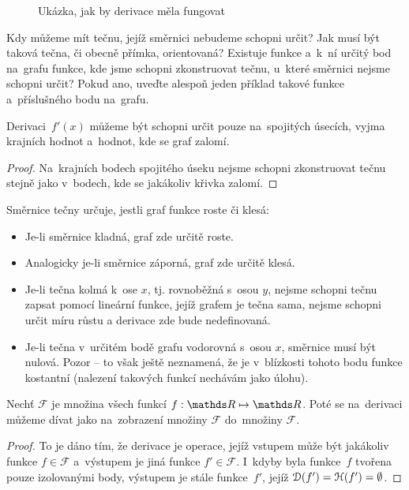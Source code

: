 \begin{figure}[ht!]
    \centering
    
    \caption{Ukázka, jak by derivace měla fungovat}
    \label{fig:derivace-tecny}
\end{figure}

\begin{exercise}
    Kdy můžeme mít tečnu, jejíž směrnici nebudeme schopni určit? Jak musí být taková
    tečna, či obecně přímka, orientovaná? Existuje funkce a~k~ní určitý bod na~grafu
    funkce, kde jsme schopni zkonstruovat tečnu, u~které směrnici nejsme schopni
    určit? Pokud ano, uveďte alespoň jeden příklad takové funkce a~příslušného bodu
    na~grafu.
\end{exercise}

\begin{lemma}
    Derivaci~$f'(x)$ můžeme být schopni určit pouze na~spojitých úsecích, vyjma
    krajních hodnot a~hodnot, kde se graf zalomí.

    \begin{proof}
        Na~krajních bodech spojitého úseku nejsme schopni zkonstruovat tečnu stejně
        jako v~bodech, kde se jakákoliv křivka zalomí.
    \end{proof}
\end{lemma}

\begin{lemma}
    Směrnice tečny určuje, jestli graf funkce roste či klesá:
    \begin{itemize}
        \item Je-li směrnice kladná, graf zde určitě roste.
        \item Analogicky je-li směrnice záporná, graf zde určitě klesá.
        \item Je-li tečna kolmá k~ose $x$, tj. rovnoběžná s~osou $y$, nejsme
        schopni tečnu zapsat pomocí lineární funkce, jejíž grafem je tečna
        sama, nejsme schopni určit míru růstu a derivace zde bude nedefinovaná.
        \item Je-li tečna v~určitém bodě grafu vodorovná s~osou $x$, směrnice
        musí být nulová. Pozor -- to však ještě neznamená, že je v~blízkosti
        tohoto bodu funkce kostantní (nalezení takových funkcí nechávám jako
        úlohu).
    \end{itemize}
\end{lemma}

\begin{lemma}
    Nechť $\mathcal{F}$ je množina všech funkcí ${f: \reals \mapsto \reals}$. Poté se
    na~derivaci můžeme dívat jako na~zobrazení množiny $\mathcal{F}$ do~množiny
    $\mathcal{F}$.

    \begin{proof}
        To je dáno tím, že derivace je operace, jejíž vstupem může být jakákoliv
        funkce ${f \in \mathcal{F}}$ a~výstupem je jiná funkce ${f' \in \mathcal{F}}$.
        I~kdyby byla funkce~$f$ tvořena pouze izolovanými body, výstupem je stále
        funkce~$f'$, jejíž ${\mathcal{D}(f') = \mathcal{H}(f') = \emptyset}$.
    \end{proof}
\end{lemma}

